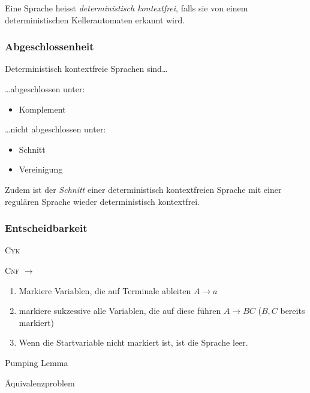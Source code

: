 \documentclass{scrartcl}
\begin{document}
\begin{shaded}
    Eine Sprache heisst \emph{deterministisch kontextfrei}, falls sie von einem deterministischen Kellerautomaten erkannt wird.
\end{shaded}

\subsubsection*{Abgeschlossenheit}
Deterministisch kontextfreie Sprachen sind\dots
\begin{minipage}[t]{0.48\textwidth}
\dots abgeschlossen unter:
\begin{itemize}
    \item Komplement
\end{itemize}
\end{minipage}
\hfill \vrule \hfill
\begin{minipage}[t]{0.48\textwidth}
\dots nicht abgeschlossen unter:
\begin{itemize}
    \item Schnitt
    \item Vereinigung
\end{itemize}
\end{minipage}

Zudem ist der \emph{Schnitt} einer deterministisch kontextfreien Sprache mit einer regulären Sprache wieder deterministisch kontextfrei.

\subsubsection*{Entscheidbarkeit}
\begin{description}
    \item[Wortproblem] \textsc{Cyk}
    \item[Leerheitsproblem] \textsc{Cnf} $\to$
    \begin{enumerate}
        \item Markiere Variablen, die auf Terminale ableiten $A\to a$
        \item markiere sukzessive alle Variablen, die auf diese führen $A\to BC$ ($B,C$ bereits markiert)
        \item Wenn die Startvariable nicht markiert ist, ist die Sprache leer.
    \end{enumerate}
    \item[Endlichkeitsproblem] Pumping Lemma
    \item Äquivalenzproblem
\end{description}
\end{document}
